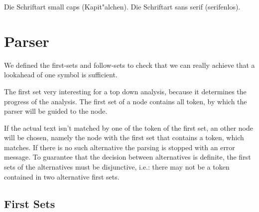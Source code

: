 \documentclass[a4paper,10pt]{article}
\begin{document}
{\sc Die Schriftart small caps (Kapit"alchen).}
{\sf Die Schriftart sans serif (serifenlos).}

\section{Parser}

We defined the first-sets and follow-sets to check that we can really achieve that a lookahead of one symbol is sufficient.

The first set very interesting for a top down analysis, because it determines the progress of the analysis.
The first set of a node contains all token, by which the parser will be guided to the node.

If the actual text isn't matched by one of the token of the first set, an other node will be chosen, namely the node with the first set that contains a token, which matches. If there is no such alternative the parsing is stopped with an error message. To guarantee that the decision between alternatives is definite, the first sets of the alternatives must be disjunctive, i.e.: there may not be a token contained in two alternative first sets. 


\subsection{First Sets}
\end{document}
